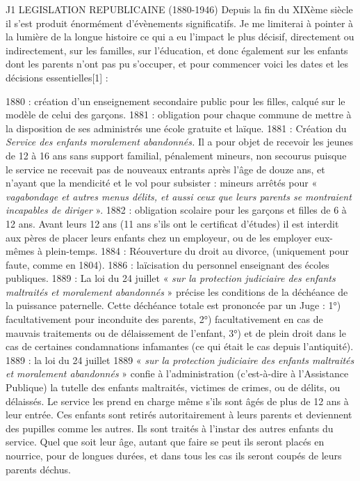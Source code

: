 J1 LEGISLATION REPUBLICAINE (1880-1946)
 Depuis la fin du XIXème siècle il s'est produit énormément d'évènements significatifs. Je me limiterai à pointer à la lumière de la longue histoire ce qui a eu l'impact le plus décisif, directement ou indirectement, sur les familles, sur l'éducation, et donc également sur les enfants dont les parents n'ont pas pu s'occuper, et pour commencer voici les dates et les décisions essentielles[1] :
 
 1880 : création d'un enseignement secondaire public pour les filles, calqué sur le modèle de celui des garçons. 
 1881 : obligation pour chaque commune de mettre à la disposition de ses administrés une école gratuite et laïque.
 1881 : Création du \emph{Service des enfants moralement abandonnés.} Il a pour objet de recevoir les jeunes de 12 à 16 ans sans support familial, pénalement mineurs, non secourus puisque le service ne recevait pas de nouveaux entrants après l'âge de douze ans, et n'ayant que la mendicité et le vol pour subsister : mineurs arrêtés pour « \emph{vagabondage et autres menus délits, et aussi ceux que leurs parents se montraient incapables de diriger} ».
 1882 : obligation scolaire pour les garçons et filles de 6 à 12 ans. Avant leurs 12 ans (11 ans s'ils ont le certificat d'études) il est interdit aux pères de placer leurs enfants chez un employeur, ou de les employer eux-mêmes à plein-temps.
 1884 : Réouverture du droit au divorce, (uniquement pour faute, comme en 1804).
 1886 : laïcisation du personnel enseignant des écoles publiques. 
 1889 : La loi du 24 juillet « \emph{sur la protection judiciaire des enfants maltraités et moralement abandonnés} » précise les conditions de la déchéance de la puissance paternelle. Cette déchéance totale est prononcée par un Juge : 1°) facultativement pour inconduite des parents, 2°) facultativement en cas de mauvais traitements ou de délaissement de l'enfant, 3°) et de plein droit dans le cas de certaines condamnations infamantes (ce qui était le cas depuis l'antiquité). 
 1889 : la loi du 24 juillet 1889 « \emph{sur la protection judiciaire des enfants maltraités et moralement abandonnés} » confie à l'administration (c'est-à-dire à l'Assistance Publique) la tutelle des enfants maltraités, victimes de crimes, ou de délits, ou délaissés. Le service les prend en charge même s'ils sont âgés de plus de 12 ans à leur entrée. Ces enfants sont retirés autoritairement à leurs parents et deviennent des pupilles comme les autres. Ils sont traités à l'instar des autres enfants du service. Quel que soit leur âge, autant que faire se peut ils seront placés en nourrice, pour de longues durées, et dans tous les cas ils seront coupés de leurs parents déchus.

